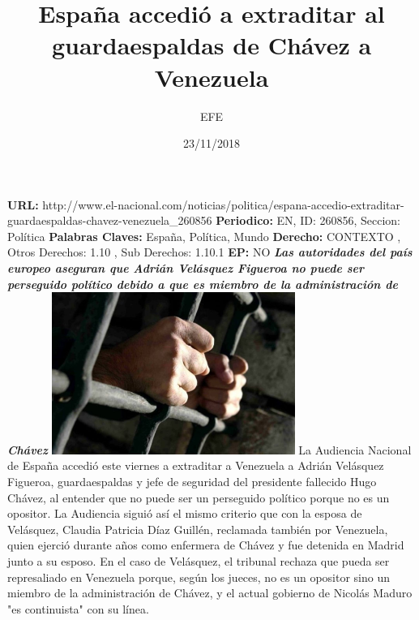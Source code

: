 \documentclass{article}%
\title{\textbf{España accedió a extraditar al guardaespaldas de Chávez a Venezuela}}%
\author{EFE}%
\date{23/11/2018}%
\begin{document}
%
\normalsize%
\maketitle%
\textbf{URL: }%
http://www.el{-}nacional.com/noticias/politica/espana{-}accedio{-}extraditar{-}guardaespaldas{-}chavez{-}venezuela\_260856\newline%
%
\textbf{Periodico: }%
EN, %
ID: %
260856, %
Seccion: %
Política\newline%
%
\textbf{Palabras Claves: }%
España, Política, Mundo\newline%
%
\textbf{Derecho: }%
CONTEXTO%
, Otros Derechos: %
1.10%
, Sub Derechos: %
1.10.1%
\newline%
%
\textbf{EP: }%
NO\newline%
\newline%
%
\textbf{\textit{Las autoridades del país europeo aseguran que Adrián Velásquez Figueroa no puede ser perseguido político debido a que es miembro de la administración de Chávez}}%
\newline%
\newline%
%
\includegraphics[width=300px]{63.jpg}%
\newline%
%
La Audiencia Nacional de España accedió este viernes a extraditar a Venezuela a Adrián Velásquez Figueroa, guardaespaldas y jefe de seguridad del presidente fallecido Hugo Chávez, al entender que no puede ser un perseguido político porque no es un opositor.%
\newline%
%
La Audiencia siguió así el mismo criterio que con la esposa de Velásquez, Claudia Patricia Díaz Guillén, reclamada también por Venezuela, quien ejerció durante años como enfermera de Chávez y fue detenida en Madrid junto a su esposo.%
\newline%
%
En el caso de Velásquez, el tribunal rechaza que pueda ser represaliado en Venezuela porque, según los jueces, no es un opositor sino un miembro de la administración de Chávez, y el actual gobierno de Nicolás Maduro "es continuista" con su línea.%
\newline%
\end{document}
